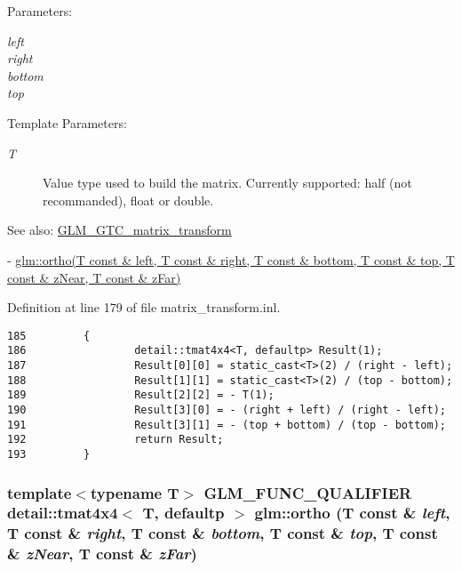 \begin{Desc}
\item[Parameters:]
\begin{description}
\item[{\em left}]\item[{\em right}]\item[{\em bottom}]\item[{\em top}]\end{description}
\end{Desc}
\begin{Desc}
\item[Template Parameters:]
\begin{description}
\item[{\em T}]Value type used to build the matrix. Currently supported: half (not recommanded), float or double. \end{description}
\end{Desc}
\begin{Desc}
\item[See also:]\hyperlink{group__gtc__matrix__transform}{GLM\_\-GTC\_\-matrix\_\-transform} 

- \hyperlink{group__gtc__matrix__transform_gf420978f35ff47883f417cef1e4d6a15}{glm::ortho(T const \& left, T const \& right, T const \& bottom, T const \& top, T const \& zNear, T const \& zFar)} \end{Desc}


Definition at line 179 of file matrix\_\-transform.inl.

\begin{Code}\begin{verbatim}185         {
186                 detail::tmat4x4<T, defaultp> Result(1);
187                 Result[0][0] = static_cast<T>(2) / (right - left);
188                 Result[1][1] = static_cast<T>(2) / (top - bottom);
189                 Result[2][2] = - T(1);
190                 Result[3][0] = - (right + left) / (right - left);
191                 Result[3][1] = - (top + bottom) / (top - bottom);
192                 return Result;
193         }
\end{verbatim}
\end{Code}


\hypertarget{group__gtc__matrix__transform_gf420978f35ff47883f417cef1e4d6a15}{
\subsubsection[ortho]{\setlength{\rightskip}{0pt plus 5cm}template$<$typename T$>$ GLM\_\-FUNC\_\-QUALIFIER detail::tmat4x4$<$ T, defaultp $>$ glm::ortho (T const \& {\em left}, \/  T const \& {\em right}, \/  T const \& {\em bottom}, \/  T const \& {\em top}, \/  T const \& {\em zNear}, \/  T const \& {\em zFar})}}
\label{group__gtc__matrix__transform_gf420978f35ff47883f417cef1e4d6a15}


